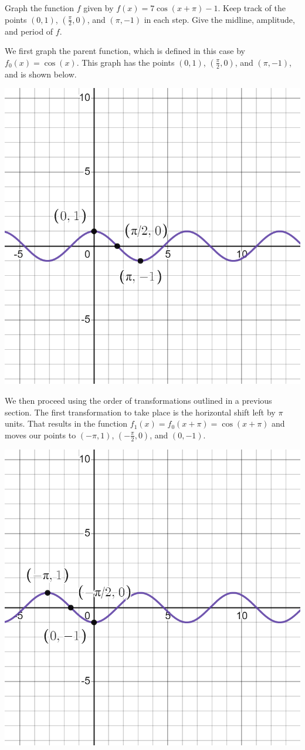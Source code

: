 \documentclass{ximera}
\begin{document}
\begin{example}
Graph the function $f$ given by $f(x) = 7\cos(x + \pi) - 1$. Keep track of the points $(0, 1)$, $\left(\frac{\pi}{2}, 0\right)$, and $(\pi, -1)$ in each step. Give the midline, amplitude, and period of $f$. 
\begin{explanation}
We first graph the parent function, which is defined in this case by $f_0(x) = \cos(x)$. This graph has the points $(0, 1)$, $\left(\frac{\pi}{2}, 0\right)$, and $(\pi, -1)$, and is shown below.
\begin{image}
\includegraphics[width=0.8\linewidth]{images/graph-ex1.png}
\end{image}

We then proceed using the order of transformations outlined in a previous section. The first transformation to take place is the horizontal shift left by $\pi$ units. That results in the function $f_1(x) = f_0(x + \pi) = \cos(x + \pi)$ and moves our points to $(-\pi, 1)$, $\left(-\frac{\pi}{2}, 0\right)$, and $(0, -1)$.
\begin{image}
\includegraphics[width=0.8\linewidth]{images/graph-ex2.png}
\end{image} 


\end{explanation}
\end{example}
\end{document}
